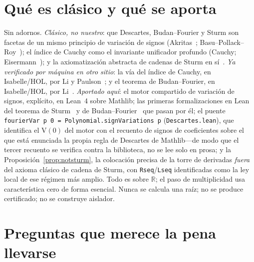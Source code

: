 \documentclass[11pt]{article}
\newcommand{\lean}[1]{{\def\_{\textunderscore\allowbreak}\texttt{#1}}}
\newcommand{\R}{\mathbb{R}}
\newcommand{\V}{\mathrm{V}}
\begin{document}
\section{Qu\'e es cl\'asico y qu\'e se aporta}\label{sec:ours}

Sin adornos. \emph{Cl\'asico, no nuestro}: que Descartes, Budan--Fourier y Sturm son facetas de un mismo
principio de variaci\'on de signos (Akritas~\cite{akritas}; Basu--Pollack--Roy~\cite{bpr}); el \'indice de
Cauchy como el invariante unificador profundo (Cauchy; Eisermann~\cite{eisermann}); y la axiomatizaci\'on
abstracta de cadenas de Sturm en s\'i~\cite{eisermann}. \emph{Ya verificado por m\'aquina en otro sitio}: la
v\'ia del \'indice de Cauchy, en Isabelle/HOL, por Li y Paulson~\cite{liCauchy}; y el teorema de
Budan--Fourier, en Isabelle/HOL, por Li~\cite{liBF}. \emph{Aportado aqu\'i}: el motor compartido de
variaci\'on de signos, expl\'icito, en Lean~4 sobre Mathlib; las primeras formalizaciones en Lean del teorema
de Sturm~\cite{sturmlean} y de Budan--Fourier~\cite{budanlean} que pasan por \'el; el puente
\lean{fourierVar p 0 = Polynomial.signVariations p} (\lean{Descartes.lean}), que identifica el $\V(0)$ del
motor con el recuento de signos de coeficientes sobre el que est\'a enunciada la propia regla de Descartes de
Mathlib---de modo que el tercer recuento se verifica contra la biblioteca, no se lee solo en prosa; y la
Proposici\'on~\ref{prop:notsturm}, la colocaci\'on precisa de la torre de derivadas \emph{fuera} del axioma
cl\'asico de cadena de Sturm, con \lean{Rseq}/\lean{Lseq} identificadas como la ley local de ese r\'egimen
m\'as amplio. Todo es sobre $\R$; el paso de multiplicidad usa caracter\'istica cero de forma esencial. Nunca
se calcula una ra\'iz; no se produce certificado; no se construye aislador.

\section{Preguntas que merece la pena llevarse}\label{sec:open}
\end{document}
